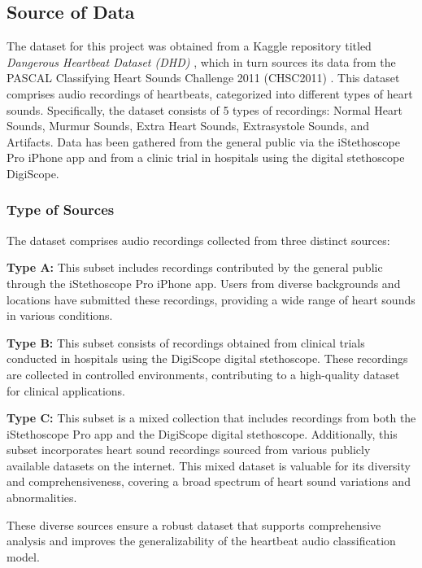 \subsection{Source of Data}
The dataset for this project was obtained from a Kaggle repository titled \textit{Dangerous Heartbeat Dataset (DHD)} \cite{Dangerous-Heartbeat-Dataset-DHD}, 
which in turn sources its data from the PASCAL Classifying Heart Sounds Challenge 2011 (CHSC2011) \cite{pascal-chsc-2011}. 
This dataset comprises audio recordings of heartbeats, categorized into different types of heart sounds.
Specifically, the dataset consists of 5 types of recordings: Normal Heart Sounds, Murmur Sounds, Extra Heart Sounds, Extrasystole Sounds, and Artifacts.
Data has been gathered from the general public via the iStethoscope Pro iPhone app and from a clinic trial in hospitals using the digital stethoscope DigiScope.

\subsubsection*{Type of Sources} %
The dataset comprises audio recordings collected from three distinct sources:

\vspace{0.2cm}\noindent
\textbf{Type A:}
This subset includes recordings contributed by the general public through the iStethoscope Pro iPhone app. 
Users from diverse backgrounds and locations have submitted these recordings, providing a wide range of heart sounds in various conditions.

\vspace{0.2cm}\noindent
\textbf{Type B:}  
This subset consists of recordings obtained from clinical trials conducted in hospitals using the DigiScope digital stethoscope. 
These recordings are collected in controlled environments, contributing to a high-quality dataset for clinical applications.

\vspace{0.2cm}\noindent
\textbf{Type C:}
This subset is a mixed collection that includes recordings from both the iStethoscope Pro app and the DigiScope digital stethoscope. 
Additionally, this subset incorporates heart sound recordings sourced from various publicly available datasets on the internet. 
This mixed dataset is valuable for its diversity and comprehensiveness, covering a broad spectrum of heart sound variations and abnormalities.

\noindent
These diverse sources ensure a robust dataset that supports comprehensive analysis and improves the generalizability of the heartbeat audio classification model.
